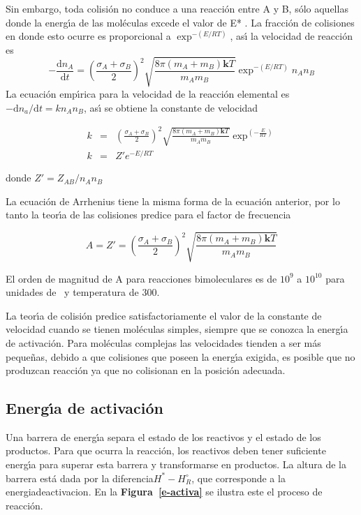 Sin embargo, toda colisi\'on no conduce a una reacci\'on entre A y B, s\'olo aquellas donde la energ\'{\i}a de las mol\'eculas excede el valor de E* . La fracci\'on de colisiones en donde esto ocurre es proporcional a \( \exp^{-(E/RT)} \), as\'{\i}  la velocidad de reacci\'on es
\begin{equation}
 -\frac{\mathrm{d}n_A}{\mathrm{d}t}=\left(\frac{ \sigma_A+ \sigma_B }{ 2 }\right)^2 \sqrt{\frac{8 \pi(m_A+m_B)\textbf{k}T }{m_Am_B}} \exp^{-(E/RT)} n_An_B 
\end{equation}
La ecuaci\'on emp\'{\i}rica para la velocidad de la reacci\'on elemental es \( -\mathrm{d}n_a/\mathrm{d}t=kn_An_B \), as\'{\i} se obtiene la constante de velocidad

\begin{eqnarray}
 k&=&\left(\frac{ \sigma_A+ \sigma_B }{ 2 }\right)^2 \sqrt{\frac{8 \pi(m_A+m_B)\textbf{k}T }{m_Am_B}} \exp^{(-\frac{E}{RT})} \\
 k&=&Z'e^{-E/RT}
\end{eqnarray}

donde \( Z'=Z_{AB}/n_An_B \)

La ecuaci\'on de Arrhenius  tiene la misma forma de la ecuaci\'on anterior, por lo tanto la teor\'{\i}a de las colisiones predice para el factor de frecuencia 

\begin{equation}
A=Z'= \left(\frac{ \sigma_A+ \sigma_B }{ 2 }\right)^2 \sqrt{\frac{8 \pi(m_A+m_B)\textbf{k}T }{m_Am_B}}
\end{equation}

El orden de magnitud de A para reacciones bimoleculares es de $10^9$ a $10^{10}$ para unidades de \mole\per\liter~y temperatura de 300\kelvin.

La teor\'{\i}a de colisi\'on predice satisfactoriamente el valor de la constante de velocidad cuando se tienen mol\'eculas simples, siempre que se conozca la energ\'{\i}a de activaci\'on. Para mol\'eculas complejas las velocidades tienden a ser m\'as peque\~nas, debido a que  colisiones que poseen la energ\'{\i}a exigida, es posible que no produzcan reacci\'on ya que no colisionan en la posici\'on adecuada.

\subsection{Energ\'{\i}a de activaci\'on}

Una barrera de energ\'{\i}a separa el estado de los reactivos y el estado de los productos. Para que ocurra la reacci\'on, los reactivos deben tener suficiente energ\'{\i}a para superar esta barrera y transformarse en productos. La altura de la barrera est\'a dada por la diferencia$H^* - H^\circ _R$, que corresponde a la \gls{energiadeactivacion}.
  En la \textbf{Figura~\ref{e-activa}} se ilustra este el proceso de reacci\'on. 

